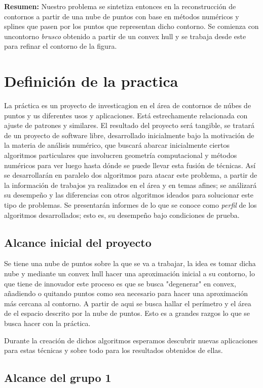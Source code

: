\documentclass[final, 12pt letterpaper]{article}
\begin{document}
\noindent\textbf{Resumen:} Nuestro problema se sintetiza entonces en la reconstrucción de contornos a partir de una nube de puntos con base en métodos numéricos y splines que pasen por los puntos que representan dicho contorno. Se comienza con uncontorno \emph{brusco} obtenido a partir de un convex hull y se trabaja desde este para refinar el contorno de la figura.
\clearpage

\section{Definición de la practica}
La práctica es un proyecto de investicagion en el área de contornos de núbes de puntos y us diferentes usos y aplicaciones. Está estrechamente relacionada con ajuste de patrones y similares.
El resultado del proyecto será tangible, se tratará de un proyecto de software libre, desarrollado inicialmente bajo la motivación de la materia de análisis numérico, que buscará abarcar inicialmente ciertos algoritmos particulares que involucren geometría computacional y métodos numéricos para ver luego hasta dónde se puede llevar esta fusión de técnicas. Así se desarrollarán en paralelo dos algoritmos para atacar este problema, a partir de la información de trabajos ya realizados en el área y en temas afines; se análizará su desempeño y las diferencias con otros algoritmos ideados para solucionar este tipo de problemas. Se presentarán informes de lo que se conoce como \emph{perfil} de los algoritmos desarrollados; esto es, su desempeño bajo condiciones de prueba.
\subsection{Alcance inicial del proyecto}
Se tiene una nube de puntos sobre la que se va a trabajar, la idea es tomar dicha nube y mediante un convex hull hacer una aproximación inicial a su contorno, lo que tiene de innovador este proceso es que se busca "degenerar" en convex, añadiendo o quitando puntos como sea necesario para hacer una aproximación más cercana al contorno. A partir de aqui se busca hallar el perímetro y el área de el espacio descrito por la nube de puntos. Esto es a grandes razgos lo que se busca hacer con la práctica. 

Durante la creación de dichos algoritmos esperamos descubrir nuevas aplicaciones para estas técnicas y sobre todo para los resultados obtenidos de ellas.

\subsection{Alcance del grupo 1}
\end{document}
